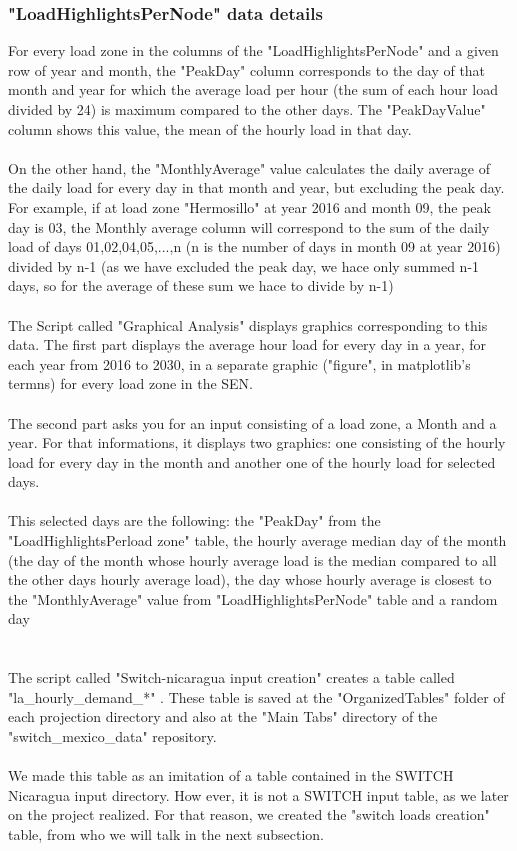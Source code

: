 \documentclass{article}
\begin{document}
\subsubsection{"LoadHighlightsPerNode" data details}
For every load zone in the columns of the "LoadHighlightsPerNode" and a given row of year and month, the "PeakDay" column corresponds to the day of that month and year for which the average load per hour (the sum of each hour load divided by 24) is maximum compared to the other days. The "PeakDayValue" column shows this value, the mean of the hourly load in that day. 
\\
\\On the other hand, the "MonthlyAverage" value calculates the daily average of the daily load for every day in that month and year, but excluding the peak day. For example, if at load zone "Hermosillo" at year 2016 and month 09, the peak day is 03, the Monthly average column will correspond to the sum of the daily load of days 01,02,04,05,...,n (n is the number of days in month 09 at year 2016) divided by n-1 (as we have excluded the peak day, we hace only summed n-1 days, so for the average of these sum we hace to divide by n-1)
\\
\\
The Script called "Graphical Analysis" displays graphics corresponding to this data. The first part displays the average hour load for every day in a year, for each year from 2016 to 2030, in a separate graphic ("figure", in matplotlib's termns) for every load zone in the SEN.
\\
\\The second part asks you for an input consisting of a load zone, a Month and a year. For that informations, it displays two graphics: one consisting of the hourly load for every day in the month and another one of the hourly load for selected days. 
\\
\\This selected days are the following: the "PeakDay" from the "LoadHighlightsPerload zone" table, the hourly average median day of the month (the day of the month whose hourly average load is the median compared to all the other days hourly average load), the day whose hourly average is closest to the "MonthlyAverage" value from "LoadHighlightsPerNode" table and a random day
\\
\\
\\The script called "Switch-nicaragua input creation" creates a table called "la\_hourly\_demand\_*" . These table is saved at the "OrganizedTables" folder of each projection directory and also at the "Main Tabs" directory of the "switch\_mexico\_data" repository. 
\\
\\ We made this table as an imitation of a table contained in   the SWITCH Nicaragua input directory. How ever, it is not a SWITCH input table, as we later on the project realized. For that reason, we created the "switch loads creation" table, from who we will talk in the next subsection.
\end{document}
